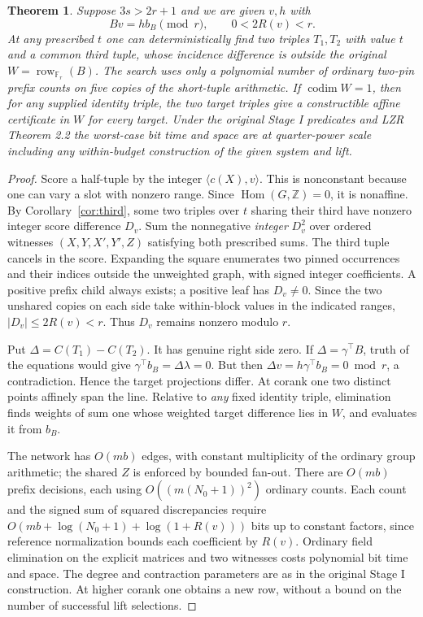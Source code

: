 \documentclass[11pt]{article}
\newtheorem{theorem}{Theorem}
\newcommand{\Z}{\mathbb Z}
\newcommand{\F}{\mathbb F}
\begin{document}
\begin{theorem}\label{th:height}
Suppose $3s>2r+1$ and we are given $v,h$ with
\[
 Bv=h b_B\pmod r,\qquad 0<2R(v)<r.
\]
At \emph{any} prescribed $t$ one can deterministically find two triples $T_1,T_2$ with value $t$ and a common third tuple, whose incidence difference is outside the original $W=\operatorname{row}_{\F_r}(B)$. The search uses only a polynomial number of ordinary two-pin prefix counts on five copies of the short-tuple arithmetic. If $\operatorname{codim} W=1$, then for any supplied identity triple, the two target triples give a constructible affine certificate in $W$ for every target. Under the original Stage I predicates and LZR Theorem 2.2 the worst-case bit time and space are at quarter-power scale including any within-budget construction of the given system and lift.
\end{theorem}
\begin{proof}
Score a half-tuple by the integer $\langle c(X),v\rangle$. This is nonconstant because one can vary a slot with nonzero range. Since $\operatorname{Hom}(G,\Z)=0$, it is nonaffine. By Corollary~\ref{cor:third}, some two triples over $t$ sharing their third have nonzero integer score difference $D_v$. Sum the nonnegative \emph{integer} $D_v^2$ over ordered witnesses $(X,Y,X',Y',Z)$ satisfying both prescribed sums. The third tuple cancels in the score. Expanding the square enumerates two pinned occurrences and their indices outside the unweighted graph, with signed integer coefficients. A positive prefix child always exists; a positive leaf has $D_v\ne0$. Since the two unshared copies on each side take within-block values in the indicated ranges, $|D_v|\le2R(v)<r$. Thus $D_v$ remains nonzero modulo $r$.

Put $\Delta=C(T_1)-C(T_2)$. It has genuine right side zero. If $\Delta=\gamma^\top B$, truth of the equations would give $\gamma^\top b_B=\Delta\lambda=0$. But then $\Delta v=h\gamma^\top b_B=0\bmod r$, a contradiction. Hence the target projections differ. At corank one two distinct points affinely span the line. Relative to \emph{any} fixed identity triple, elimination finds weights of sum one whose weighted target difference lies in $W$, and evaluates it from $b_B$.

The network has $O(mb)$ edges, with constant multiplicity of the ordinary group arithmetic; the shared $Z$ is enforced by bounded fan-out. There are $O(mb)$ prefix decisions, each using $O((m(N_0+1))^2)$ ordinary counts. Each count and the signed sum of squared discrepancies require $O(mb+\log(N_0+1)+\log(1+R(v)))$ bits up to constant factors, since reference normalization bounds each coefficient by $R(v)$. Ordinary field elimination on the explicit matrices and two witnesses costs polynomial bit time and space. The degree and contraction parameters are as in the original Stage I construction. At higher corank one obtains a new row, without a bound on the number of successful lift selections.
\end{proof}
\end{document}
